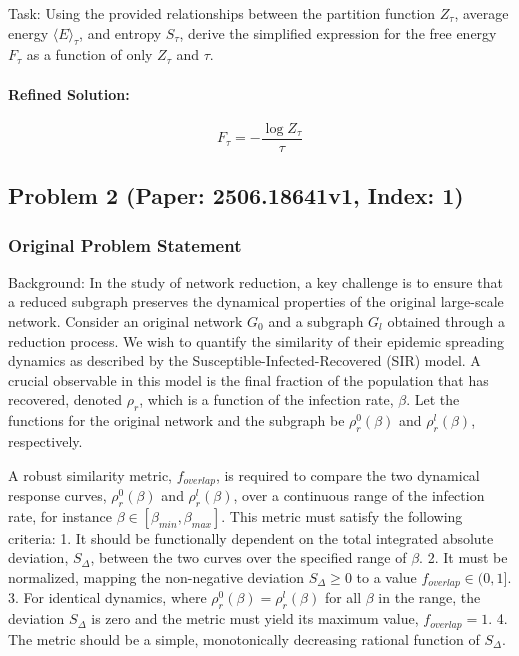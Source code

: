 \documentclass[10pt]{article}
\begin{document}
Task:
Using the provided relationships between the partition function $Z_{\tau}$, average energy $\langle E \rangle_{\tau}$, and entropy $S_{\tau}$, derive the simplified expression for the free energy $F_{\tau}$ as a function of only $Z_{\tau}$ and $\tau$.

\paragraph*{Refined Solution:}
\[ F_{\tau} = -\frac{\log Z_{\tau}}{\tau} \]

\newpage
\subsection*{Problem 2 (Paper: 2506.18641v1, Index: 1)}

\subsubsection*{Original Problem Statement}
Background:
In the study of network reduction, a key challenge is to ensure that a reduced subgraph preserves the dynamical properties of the original large-scale network. Consider an original network $G_0$ and a subgraph $G_l$ obtained through a reduction process. We wish to quantify the similarity of their epidemic spreading dynamics as described by the Susceptible-Infected-Recovered (SIR) model. A crucial observable in this model is the final fraction of the population that has recovered, denoted $\rho_r$, which is a function of the infection rate, $\beta$. Let the functions for the original network and the subgraph be $\rho_r^0(\beta)$ and $\rho_r^l(\beta)$, respectively.

A robust similarity metric, $f_{overlap}$, is required to compare the two dynamical response curves, $\rho_r^0(\beta)$ and $\rho_r^l(\beta)$, over a continuous range of the infection rate, for instance $\beta \in [\beta_{min}, \beta_{max}]$. This metric must satisfy the following criteria:
1. It should be functionally dependent on the total integrated absolute deviation, $S_{\Delta}$, between the two curves over the specified range of $\beta$.
2. It must be normalized, mapping the non-negative deviation $S_{\Delta} \ge 0$ to a value $f_{overlap} \in (0, 1]$.
3. For identical dynamics, where $\rho_r^0(\beta) = \rho_r^l(\beta)$ for all $\beta$ in the range, the deviation $S_{\Delta}$ is zero and the metric must yield its maximum value, $f_{overlap} = 1$.
4. The metric should be a simple, monotonically decreasing rational function of $S_{\Delta}$.
\end{document}
